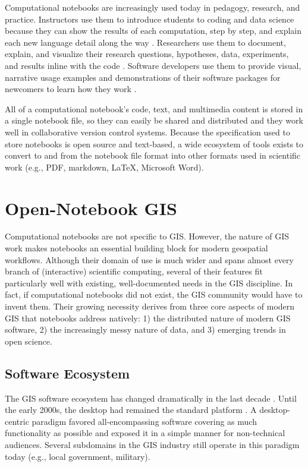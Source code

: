 \documentclass[11pt,letterpaper]{article}
\begin{document}
Computational notebooks are increasingly used today in pedagogy, research, and practice. Instructors use them to introduce students to coding and data science because they can show the results of each computation, step by step, and explain each new language detail along the way \citep{reades_teaching_2020}. Researchers use them to document, explain, and visualize their research questions, hypotheses, data, experiments, and results inline with the code \citep{perkel_why_2018}. Software developers use them to provide visual, narrative usage examples and demonstrations of their software packages for newcomers to learn how they work \citep{boeing_urban_2020}.

All of a computational notebook's code, text, and multimedia content is stored in a single notebook file, so they can easily be shared and distributed and they work well in collaborative version control systems. Because the specification used to store notebooks is open source and text-based, a wide ecosystem of tools exists to convert to and from the notebook file format into other formats used in scientific work (e.g., PDF, markdown, LaTeX, Microsoft Word).

\section{Open-Notebook GIS}

Computational notebooks are not specific to GIS. However, the nature of GIS work makes notebooks an essential building block for modern geospatial workflows. Although their domain of use is much wider and spans almost every branch of (interactive) scientific computing, several of their features fit particularly well with existing, well-documented needs in the GIS discipline. In fact, if computational notebooks did not exist, the GIS community would have to invent them. Their growing necessity derives from three core aspects of modern GIS that notebooks address natively: 1) the distributed nature of modern GIS software, 2) the increasingly messy nature of data, and 3) emerging trends in open science.

\subsection{Software Ecosystem}

The GIS software ecosystem has changed dramatically in the last decade \citep{arribas-bel_geography_2018}. Until the early 2000s, the desktop had remained the standard platform \citep{gahegan_our_2018}. A desktop-centric paradigm favored all-encompassing software covering as much functionality as possible and exposed it in a simple manner for non-technical audiences. Several subdomains in the GIS industry still operate in this paradigm today (e.g., local government, military).
\end{document}
